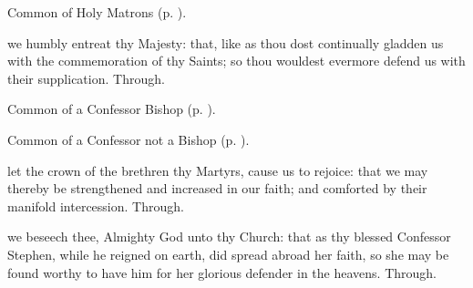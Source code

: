 \clearpage
{}

\begin{rubric}
	Common of Holy Matrons (p. \pageref{CommonHolyMatronsCollect}).
\end{rubric}



\memorialCollect
{} we humbly entreat thy Majesty: that, like as thou dost continually gladden us with the commemoration of thy Saints; so thou wouldest evermore defend us with their supplication. Through.



\begin{rubric}
	Common of a Confessor Bishop (p. \pageref{ConfessorBishopCollect}).
\end{rubric}



\begin{rubric}
	Common of a Confessor not a Bishop (p. \pageref{AbbotCollect}).
\end{rubric}



\memorialCollect
{} let the crown of the brethren thy Martyrs, cause us to rejoice: that we may thereby be strengthened and increased in our faith; and comforted by their manifold intercession. Through.



\memorialCollect
{} we beseech thee, Almighty God unto thy Church: that as thy blessed Confessor Stephen, while he reigned on earth, did spread abroad her faith, so she may be found worthy to have him for her glorious defender in the heavens. Through.



